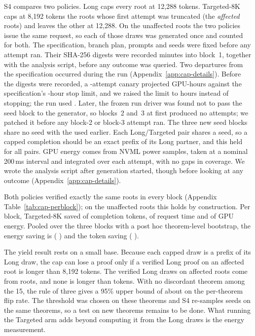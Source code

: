 S4 compares two policies.  Long caps every root at 12,288 tokens.  Targeted-8K caps at 8,192 tokens the \CapAffectedRoots{} roots whose first attempt was truncated (the \emph{affected} roots) and leaves the other \CapUnaffectedRoots{} at 12,288.  On the unaffected roots the two policies issue the same request, so each of those draws was generated once and counted for both.  The specification, branch plan, prompts and seeds were fixed before any attempt ran.  Their SHA-256 digests were recorded \CapHashDelayMin{} minutes into block~1, together with the analysis script, before any outcome was queried.  Two departures from the specification occurred during the run (Appendix~\ref{app:cap-details}).  Before the digests were recorded, a \CapCanaryBranches{}-attempt canary projected \CapCanaryProjHours{} GPU-hours against the specification's \CapBudgetFrozen{}-hour stop limit, and we raised the limit to \CapBudgetRaised{} hours instead of stopping; the run used \CapRunGPUHours{}.  Later, the frozen run driver was found not to pass the seed block to the generator, so blocks~2 and~3 at first produced no attempts; we patched it before any block-2 or block-3 attempt ran.  The three new seed blocks share no seed with the \CapSeedsKnown{} used earlier.  Each Long/Targeted pair shares a seed, so a capped completion should be an exact prefix of its Long partner, and this held for all \CapPrefixChecked{} pairs.  GPU energy comes from NVML power samples, taken at a nominal 200\,ms interval and integrated over each attempt, with no gaps in coverage.  We wrote the analysis script after generation started, though before looking at any outcome (Appendix~\ref{app:cap-details}).

Both policies verified exactly the same roots in every block (Appendix Table~\ref{tab:cap-perblock}); on the unaffected roots this holds by construction.  Per block, Targeted-8K saved \CapTokensSavedRange{} of completion tokens, \CapWallSavedRange{} of request time and \CapJoulesSavedRange{} of GPU energy.  Pooled over the three blocks with a post hoc theorem-level bootstrap, the energy saving is \CrCapEnergyPooled{} (\ci{} \CrCapEnergyPooledCI{}) and the token saving \CrCapTokensPooled{} (\ci{} \CrCapTokensPooledCI{}).

The yield result rests on a small base.  Because each capped draw is a prefix of its Long draw, the cap can lose a proof only if a verified Long proof on an affected root is longer than 8,192 tokens.  The \CrAffVerifiedDraws{} verified Long draws on affected roots come from \CrAffVerifiedRoots{} roots, and none is longer than \CrAffVerifiedMaxTok{} tokens.  With no discordant theorem among the 15, the rule of three gives a 95\% upper bound of about \CapDiscordantUpperPct{} on the per-theorem flip rate.  The threshold was chosen on these theorems and S4 re-samples seeds on the same theorems, so a test on new theorems remains to be done.  What running the Targeted arm adds beyond computing it from the Long draws is the energy measurement.

